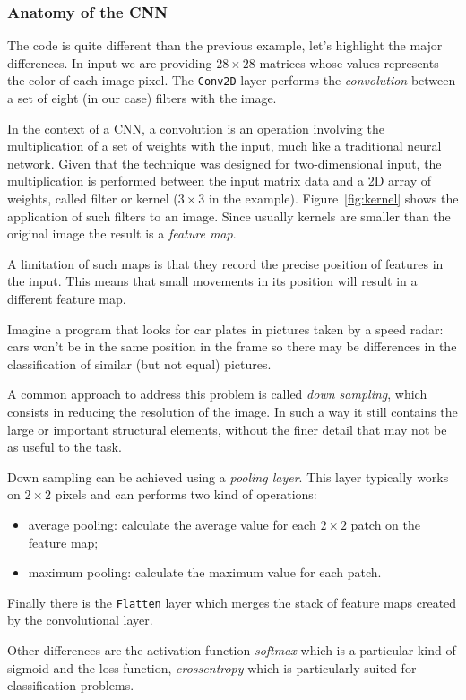 \begin{attention}
\subsubsection{Anatomy of the CNN}

The code is quite different than the previous example, let's highlight the major differences.
In input we are providing $28\times 28$ matrices whose values represents the color of each image pixel. 
The \texttt{Conv2D} layer performs the \emph{convolution} between a set of eight (in our case) filters with the image. 

In the context of a CNN, a convolution is an operation involving the multiplication of a set of weights with the input, much like a traditional neural network. Given that the technique was designed for two-dimensional input, the multiplication is performed between the input matrix data and a 2D array of weights, called filter or kernel ($3\times 3$ in the example). Figure~\ref{fig:kernel} shows the application of such filters to an image. Since usually kernels are smaller than the original image the result is a \emph{feature map}.

A limitation of such maps is that they record the precise position of features in the input. This means that small movements in its position will result in a different feature map. 

Imagine a program that looks for car plates in pictures taken by a speed radar: cars won't be in the same position in the frame so there may be differences in the classification of similar (but not equal) pictures.

A common approach to address this problem is called \emph{down sampling}, which consists in reducing the resolution of the image. In such a way it still contains the large or important structural elements, without the finer detail that may not be as useful to the task.

Down sampling can be achieved using a \emph{pooling layer}. This layer typically works on $2\times 2$ pixels and can performs two kind of operations:
\begin{itemize}
\tightlist
\item average pooling: calculate the average value for each $2\times 2$ patch on the feature map;
\item maximum pooling: calculate the maximum value for each patch.
\end{itemize}

Finally there is the \texttt{Flatten} layer which merges the stack of feature maps created by the convolutional layer.

Other differences are the activation function \emph{softmax} which is a particular kind of sigmoid and the loss function, \emph{crossentropy} which is particularly suited for classification problems.
\end{attention}

